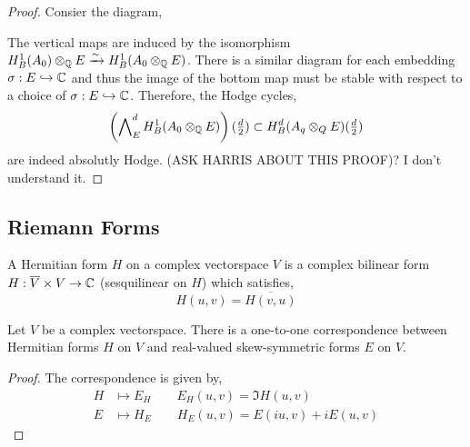 \documentclass[12pt]{article}
\begin{document}
\begin{proof}
Consier the diagram,
\begin{center}
\end{center}
The vertical maps are induced by the isomorphism $H^1_B(A_0) \otimes_{\mathbb{Q}} E \xrightarrow{\sim} H^1_B(A_0 \otimes_{\mathbb{Q}} E)$. There is a similar diagram for each embedding $\sigma : E \hookrightarrow \mathbb{C}$ and thus the image of the bottom map must be stable with respect to a choice of $\sigma : E \hookrightarrow \mathbb{C}$. Therefore, the Hodge cycles,
\[ \left( \bigwedge\nolimits^d_E H^1_B(A_0 \otimes_{\mathbb{Q}} E) \right) (\tfrac{d}{2}) \subset H^d_B(A_q \otimes_Q E) (\tfrac{d}{2}) \]
are indeed absolutly Hodge. (ASK HARRIS ABOUT THIS PROOF)? I don't understand it. 
\end{proof}

\subsection{Riemann Forms}

\begin{definition}
A Hermitian form $H$ on a complex vectorspace $V$ is a complex bilinear form $H : \overline{V} \times V \to \mathbb{C}$ (sesquilinear on $H$) which satisfies,
\[ H(u, v) = \overline{H(v, u)} \]
\end{definition}

\begin{lemma}
Let $V$ be a complex vectorspace. There is a one-to-one correspondence between Hermitian forms $H$ on $V$ and real-valued skew-symmetric forms $E$ on $V$.
\end{lemma}

\begin{proof}
The correspondence is given by,
\begin{align*}
H & \mapsto E_H \quad \quad E_H(u,v) = \Im{H(u,v)} 
\\
E & \mapsto H_E \quad \quad H_E(u,v) = E(iu, v) + i E(u, v) 
\end{align*}
\end{proof}
\end{document}
